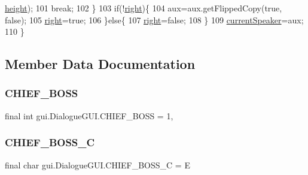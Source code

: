 \begin{DoxyCode}
      \mbox{\hyperlink{classgui_1_1_dialogue_g_u_i_a41a3d504adf0501b3c0b15ce1f046fa8}{height}});
101                 \textcolor{keywordflow}{break};
102         \}
103         \textcolor{keywordflow}{if}(!\mbox{\hyperlink{classgui_1_1_dialogue_g_u_i_ac2baedad2d743cda7bc77fcb71ad1466}{right}})\{
104             aux=aux.getFlippedCopy(\textcolor{keyword}{true}, \textcolor{keyword}{false});
105             \mbox{\hyperlink{classgui_1_1_dialogue_g_u_i_ac2baedad2d743cda7bc77fcb71ad1466}{right}}=\textcolor{keyword}{true};
106         \}\textcolor{keywordflow}{else}\{
107             \mbox{\hyperlink{classgui_1_1_dialogue_g_u_i_ac2baedad2d743cda7bc77fcb71ad1466}{right}}=\textcolor{keyword}{false};
108         \}
109         \mbox{\hyperlink{classgui_1_1_dialogue_g_u_i_a8115ee094decde84cada17b49ef77375}{currentSpeaker}}=aux;
110     \}
\end{DoxyCode}


\subsection{Member Data Documentation}
\mbox{\label{classgui_1_1_dialogue_g_u_i_aac66d699b6ad6303bb963686bf677e20}} 
\subsubsection{\texorpdfstring{C\+H\+I\+E\+F\+\_\+\+B\+O\+SS}{CHIEF\_BOSS}}
{\footnotesize\ttfamily final int gui.\+Dialogue\+G\+U\+I.\+C\+H\+I\+E\+F\+\_\+\+B\+O\+SS = 1\hspace{0.3cm}{\ttfamily [static]}, {\ttfamily [package]}}

\mbox{\label{classgui_1_1_dialogue_g_u_i_a890faca007a96dac840c960e2c6ebdc2}} 
\subsubsection{\texorpdfstring{C\+H\+I\+E\+F\+\_\+\+B\+O\+S\+S\+\_\+C}{CHIEF\_BOSS\_C}}
{\footnotesize\ttfamily final char gui.\+Dialogue\+G\+U\+I.\+C\+H\+I\+E\+F\+\_\+\+B\+O\+S\+S\+\_\+C = \textquotesingle{}E\textquotesingle{}\hspace{0.3cm}{\ttfamily [static]}}

